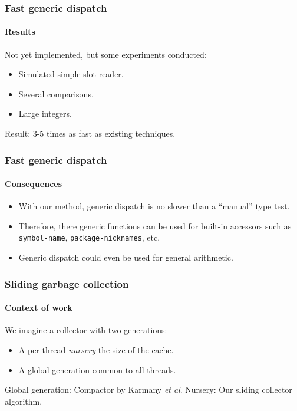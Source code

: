 \documentclass{beamer}
\begin{document}
\begin{frame}
  \frametitle{Fast generic dispatch}
  \framesubtitle{Results}

  Not yet implemented, but some experiments conducted:

  \begin{itemize}
  \item Simulated simple slot reader.
  \item Several comparisons.
  \item Large integers.
  \end{itemize}

Result: 3-5 times as fast as existing techniques.

\end{frame}
\begin{frame}
  \frametitle{Fast generic dispatch}
  \framesubtitle{Consequences}

  \begin{itemize}
  \item With our method, generic dispatch is no slower than
    a ``manual'' type test.
  \item Therefore, there generic functions can be used for built-in
    accessors such as \texttt{symbol-name},
    \texttt{package-nicknames}, etc.
  \item Generic dispatch could even be used for general arithmetic.
  \end{itemize}

\end{frame}
\begin{frame}
  \frametitle{Sliding garbage collection}
  \framesubtitle{Context of work}

  We imagine a collector with two generations:

  \begin{itemize}
  \item A per-thread \emph{nursery} the size of the cache.
  \item A global generation common to all threads.
  \end{itemize}

Global generation: Compactor by Karmany \emph{et al}.
\vskip 0.25cm
Nursery: Our sliding collector algorithm.

\end{frame}
\end{document}
